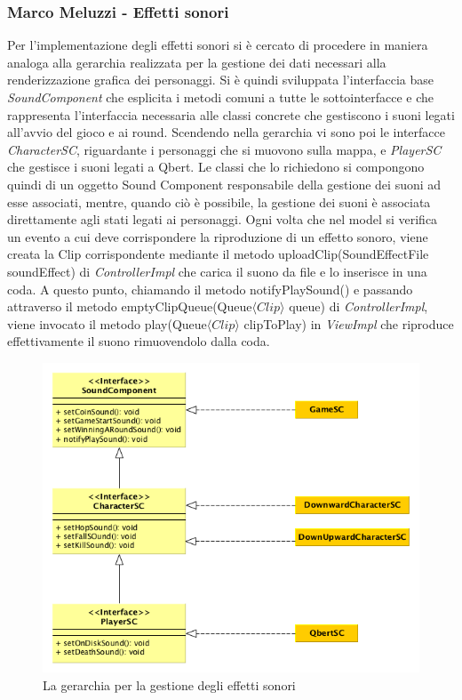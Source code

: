 \documentclass[a4paper,12pt, hidelinks]{report}
\begin{document}
\begin{flushright}
\item\subsubsection{Marco Meluzzi - Effetti sonori}
\end{flushright}

Per l'implementazione degli effetti sonori si è cercato di procedere in maniera analoga alla gerarchia realizzata per la gestione dei dati necessari alla renderizzazione grafica dei personaggi. Si è quindi sviluppata l'interfaccia base \emph{SoundComponent} che esplicita i metodi comuni a tutte le sottointerfacce e che rappresenta l'interfaccia necessaria alle classi concrete che gestiscono i suoni legati all'avvio del gioco e ai round. Scendendo nella gerarchia vi sono poi le interfacce \emph{CharacterSC}, riguardante i personaggi che si muovono sulla mappa, e \emph{PlayerSC} che gestisce i suoni legati a Qbert. Le classi che lo richiedono si compongono quindi di un oggetto Sound Component responsabile della gestione dei suoni ad esse associati, mentre, quando ciò è possibile, la gestione dei suoni è associata direttamente agli stati legati ai personaggi. Ogni volta che nel model si verifica un evento a cui deve corrispondere la riproduzione di un effetto sonoro, viene creata la Clip corrispondente mediante il metodo uploadClip(SoundEffectFile soundEffect) di \emph{ControllerImpl} che carica il suono da file e lo inserisce in una coda. A questo punto, chiamando il metodo notifyPlaySound() e passando attraverso il metodo emptyClipQueue(Queue$\langle Clip \rangle$ queue) di \emph{ControllerImpl}, viene invocato il metodo play(Queue$\langle Clip \rangle$ clipToPlay) in \emph{ViewImpl} che riproduce effettivamente il suono rimuovendolo dalla coda.

\begin{figure}[H]
\centering{}
\includegraphics[width=\linewidth]{img/GerarchiaSound}
\caption{La gerarchia per la gestione degli effetti sonori}
\label{img:GerarchiaSound}
\end{figure}
\end{document}
